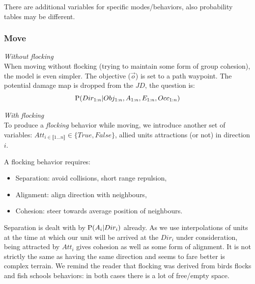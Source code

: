 There are additional variables for specific modes/behaviors, also probability tables may be different.

\subsubsection{Move}

\noindent\textit{Without flocking}\\
When moving without flocking (trying to maintain some form of group cohesion), the model is even simpler. The objective ($\vec{o}$) is set to a path waypoint. The potential damage map is dropped from the $JD$, the question is:
\begin{equation}
\mathrm{P}(Dir_{1:n} | Obj_{1:n}, A_{1:n}, E_{1:n}, Occ_{1:n})
\end{equation}

\noindent\textit{With flocking}\\
To produce a \textit{flocking} behavior while moving, we introduce another set of variables: $Att_{i \in \llbracket 1 \dots n\rrbracket} \in \{True,False\}$, allied units attractions (or not) in direction $i$.

A flocking behavior \citep{Reynolds_1999} requires:
\begin{itemize}
    \item Separation: avoid collisions, short range repulsion,
    \item Alignment: align direction with neighbours,
    \item Cohesion: steer towards average position of neighbours.
\end{itemize}
Separation is dealt with by $\mathrm{P}(A_i|Dir_i)$ already. As we use interpolations of units at the time at which our unit will be arrived at the $Dir_i$ under consideration, being attracted by $Att_i$ gives cohesion as well as some form of alignment. It is not strictly the same as having the same direction and seems to fare better is complex terrain. We remind the reader that flocking was derived from birds flocks and fish schools behaviors: in both cases there is a lot of free/empty space.

